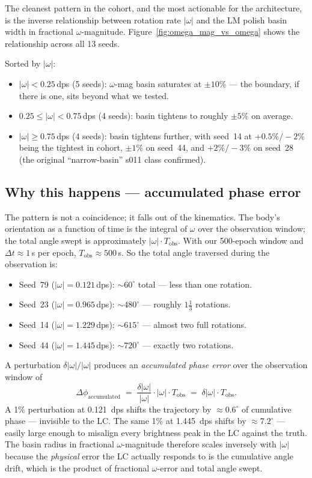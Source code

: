 \documentclass[11pt,a4paper]{article}
\begin{document}
The cleanest pattern in the cohort, and the most actionable for the architecture, is the inverse relationship between rotation rate $|\omega|$ and the LM polish basin width in fractional $\omega$-magnitude. Figure~\ref{fig:omega_mag_vs_omega} shows the relationship across all 13 seeds.

Sorted by $|\omega|$:
\begin{itemize}
\item $|\omega| < 0.25\,$dps (5 seeds): $\omega$-mag basin saturates at $\pm 10\%$ — the boundary, if there is one, sits beyond what we tested.
\item $0.25 \leq |\omega| < 0.75\,$dps (4 seeds): basin tightens to roughly $\pm 5\%$ on average.
\item $|\omega| \geq 0.75\,$dps (4 seeds): basin tightens further, with seed~14 at $+0.5\%/-2\%$ being the tightest in cohort, $\pm 1\%$ on seed~44, and $+2\%/-3\%$ on seed~28 (the original ``narrow-basin'' s011 class confirmed).
\end{itemize}

\subsection{Why this happens — accumulated phase error}

The pattern is not a coincidence; it falls out of the kinematics. The body's orientation as a function of time is the integral of $\omega$ over the observation window; the total angle swept is approximately $|\omega| \cdot T_{\mathrm{obs}}$. With our 500-epoch window and $\Delta t \approx 1\,$s per epoch, $T_{\mathrm{obs}} \approx 500\,$s. So the total angle traversed during the observation is:
\begin{itemize}
\item Seed~79 ($|\omega|=0.121\,$dps): $\sim 60^\circ$ total — less than one rotation.
\item Seed~23 ($|\omega|=0.965\,$dps): $\sim 480^\circ$ — roughly $1\tfrac{1}{3}$ rotations.
\item Seed~14 ($|\omega|=1.229\,$dps): $\sim 615^\circ$ — almost two full rotations.
\item Seed~44 ($|\omega|=1.445\,$dps): $\sim 720^\circ$ — exactly two rotations.
\end{itemize}

A perturbation $\delta|\omega|/|\omega|$ produces an \emph{accumulated phase error} over the observation window of
\begin{equation}
\Delta \phi_{\mathrm{accumulated}} \;=\; \frac{\delta |\omega|}{|\omega|} \cdot |\omega| \cdot T_{\mathrm{obs}}
                                       \;=\; \delta|\omega| \cdot T_{\mathrm{obs}}.
\end{equation}
A 1\% perturbation at 0.121~dps shifts the trajectory by $\approx 0.6^\circ$ of cumulative phase — invisible to the LC. The same 1\% at 1.445~dps shifts by $\approx 7.2^\circ$ — easily large enough to misalign every brightness peak in the LC against the truth. The basin radius in fractional $\omega$-magnitude therefore scales inversely with $|\omega|$ because the \emph{physical} error the LC actually responds to is the cumulative angle drift, which is the product of fractional $\omega$-error and total angle swept.
\end{document}
